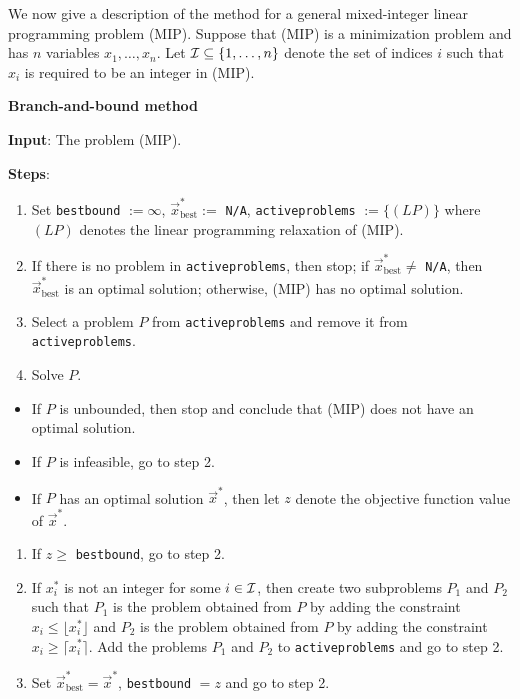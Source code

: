 We now give a description of the method for a general mixed-integer
linear programming problem (MIP). Suppose that (MIP) is a minimization
problem and has \(n\) variables \(x_1,\ldots,x_n\). Let
\({\cal I} \subseteq \{1,\ldots,n\}\) denote the set of indices \(i\)
such that \(x_i\) is required to be an integer in (MIP).

\textbf{Branch-and-bound method}

\textbf{Input}: The problem (MIP).

\textbf{Steps}:

\begin{enumerate}
\def\labelenumi{\arabic{enumi}.}
\item
  Set \texttt{bestbound} \(:= \infty\), \(\vec{x}^*_{\text{best}}:= \)
  \texttt{N/A}, \texttt{activeproblems} \(:= \{ (LP) \}\) where \((LP)\)
  denotes the linear programming relaxation of (MIP).
\item
  If there is no problem in \texttt{activeproblems}, then stop; if
  \(\vec{x}^*_{\text{best}} \neq \) \texttt{N/A}, then
  \(\vec{x}^*_{\text{best}}\) is an optimal solution; otherwise, (MIP)
  has no optimal solution.
\item
  Select a problem \(P\) from \texttt{activeproblems} and remove it from
  \texttt{activeproblems}.
\item
  Solve \(P\).
\end{enumerate}

\begin{itemize}
\item
  If \(P\) is unbounded, then stop and conclude that (MIP) does not have
  an optimal solution.
\item
  If \(P\) is infeasible, go to step 2.
\item
  If \(P\) has an optimal solution \(\vec{x}^*\), then let \(z\) denote
  the objective function value of \(\vec{x}^*\).
\end{itemize}

\begin{enumerate}
\def\labelenumi{\arabic{enumi}.}
\setcounter{enumi}{4}
\item
  If \(z \geq \) \texttt{bestbound}, go to step 2.
\item
  If \(x^*_i\) is not an integer for some \(i \in {\cal I}\), then
  create two subproblems \(P_1\) and \(P_2\) such that \(P_1\) is the
  problem obtained from \(P\) by adding the constraint
  \(x_i \leq \lfloor x^*_i \rfloor\) and \(P_2\) is the problem obtained
  from \(P\) by adding the constraint \(x_i \geq \lceil x^*_i \rceil\).
  Add the problems \(P_1\) and \(P_2\) to \texttt{activeproblems} and go
  to step 2.
\item
  Set \(\vec{x}^*_{\text{best}} = \vec{x}^*\), \texttt{bestbound} \(=z\)
  and go to step 2.
\end{enumerate}


